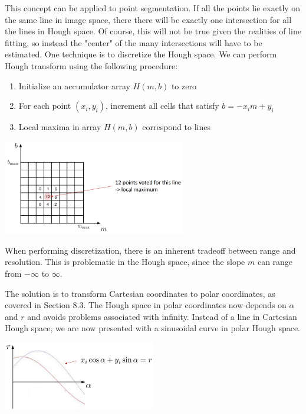 \documentclass[twoside]{article}
\begin{document}
This concept can be applied to point segmentation. If all the points lie exactly on the same line in image space, there there will be exactly one intersection for all the lines in Hough space. Of course, this will not be true given the realities of line fitting, so instead the "center" of the many intersections will have to be estimated. One technique is to discretize the Hough space. We can perform Hough transform using the following procedure:

\begin{enumerate}
\item Initialize an accumulator array $H(m,b)$ to zero
\item For each point $(x_i, y_i)$, increment all cells that satisfy $b = -x_i m + y_i$
\item Local maxima in array $H(m,b)$ correspond to lines 
\end{enumerate}

\begin{center}
	\includegraphics[width=0.6\textwidth]{hough3}
\end{center}

When performing discretization, there is an inherent tradeoff between range and resolution. This is problematic in the Hough space, since the slope $m$ can range from $-\infty$ to $\infty$. 

The solution is to transform Cartesian coordinates to polar coordinates, as covered in Section 8.3. The Hough space in polar coordinates now depends on $\alpha$ and $r$ and avoids problems associated with infinity. Instead of a line in Cartesian Hough space, we are now presented with a sinusoidal curve in polar Hough space.

\begin{center}
	\includegraphics[width=0.5\textwidth]{hough4}
\end{center}
\end{document}
